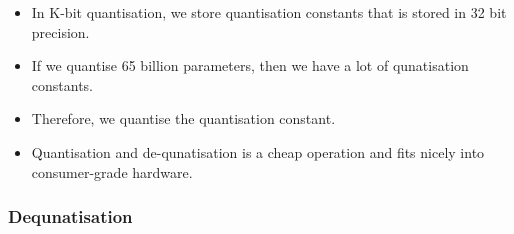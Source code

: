\documentclass[11pt]{article}
\begin{document}
\begin{minipage}[l]{.5\linewidth}
    \begin{figure}[H]
        \centering
    \end{figure}    
\end{minipage}\hfill
\begin{minipage}[r]{.48\linewidth}
    \begin{itemize}
        \item In K-bit quantisation, we store quantisation constants that is stored in 32 bit precision. 
        \item If we quantise 65 billion parameters, then we have a lot of qunatisation constants.
        \item Therefore, we quantise the quantisation constant. 
        \item Quantisation and de-qunatisation is a cheap operation and fits nicely into consumer-grade hardware.
    \end{itemize}
\end{minipage}

\subsubsection{Dequnatisation}
\end{document}

